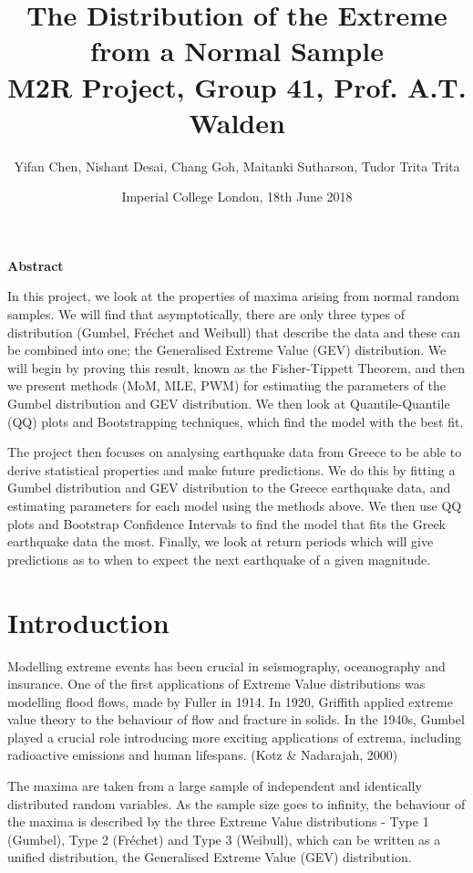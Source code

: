 \documentclass{article}
\title{\textbf{The Distribution of the Extreme from a Normal Sample\\ M2R Project, Group 41, Prof. A.T. Walden}}
\author{Yifan Chen, Nishant Desai, Chang Goh, Maitanki Sutharson, Tudor Trita Trita}
\date{Imperial College London, 18th June 2018}
\begin{document}
\maketitle
\vspace{2cm}
\begin{center}
    \textbf{Abstract}
\end{center}

In this project, we look at the properties of maxima arising from normal random samples. We will find that asymptotically, there are only three types of distribution (Gumbel, Fr\'{e}chet and Weibull) that describe the data and these can be combined into one; the Generalised Extreme Value (GEV) distribution. We will begin by proving this result, known as the Fisher-Tippett Theorem, and then we present methods (MoM, MLE, PWM) for estimating the parameters of the Gumbel distribution and GEV distribution. We then look at Quantile-Quantile (QQ) plots and Bootstrapping techniques, which find the model with the best fit.

The project then focuses on analysing earthquake data from Greece to be able to derive statistical properties and make future predictions.  We do this by fitting a Gumbel distribution and GEV distribution to the Greece earthquake data, and estimating parameters for each model using the methods above. We then use QQ plots and Bootstrap Confidence Intervals to find the model that fits the Greek earthquake data the most. Finally, we look at return periods which will give predictions as to when to expect the next earthquake of a given magnitude.

\newpage
\tableofcontents
\newpage

\section{Introduction}

Modelling extreme events has been crucial in seismography, oceanography and insurance. One of the first applications of Extreme Value distributions was modelling flood flows, made by Fuller in 1914. In 1920, Griffith applied extreme value theory to the behaviour of flow and fracture in solids. In the 1940s, Gumbel played a crucial role introducing more exciting applications of extrema, including radioactive emissions and human lifespans. (Kotz \& Nadarajah, 2000) 

The maxima are taken from a large sample of independent and identically distributed random variables. As the sample size goes to infinity, the behaviour of the maxima is described by the three Extreme Value distributions - Type 1 (Gumbel), Type 2 (Fr\'echet) and Type 3 (Weibull), which can be written as a unified distribution, the Generalised Extreme Value (GEV) distribution.
\end{document}
